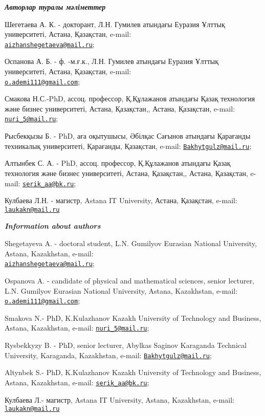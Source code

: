 \begin{authorinfo}
\emph{{\bfseries Авторлар туралы мәліметтер}}

Шегетаева А. К. - докторант, Л.Н. Гумилев атындағы Еуразия Ұлттық
университеті, Астана, Қазақстан, e-mail:\\
\href{mailto:aizhanshegetaeva@mail.ru}{\nolinkurl{aizhanshegetaeva@mail.ru}};

Оспанова А. Б. - ф. -м.ғ.к., Л.Н. Гумилев атындағы Еуразия Ұлттық
университеті, Астана, Қазақстан, e-mail:\\
\href{mailto:o.ademi111@gmail.com}{\nolinkurl{o.ademi111@gmail.com}};

Смакова Н.С.-PhD, ассоц. профессор, Қ.Құлажанов атындағы Қазақ
технология және бизнес университеті, Астана, Қазақстан,, Астана,
Қазақстан, e-mail:
\href{mailto:nuri_5@mail.ru}{\nolinkurl{nuri\_5@mail.ru}};

Рысбекқызы Б. - PhD, аға оқытушысы, Әбілқас Сағынов атындағы Қарағанды
техникалық университеті, Қарағанды, Қазақстан, e-mail:
\href{mailto:Bakhytgulz@mail.ru}{\nolinkurl{Bakhytgulz@mail.ru}};

Алтынбек С. А. - PhD, ассоц. профессор, Қ.Құлажанов атындағы Қазақ
технология және бизнес университеті, Астана, Қазақстан,, Астана,
Қазақстан, e-mail:
\href{mailto:serik_aa@bk.ru}{\nolinkurl{serik\_aa@bk.ru}};

Кулбаева Л.Н. - магистр, Astana IT University, Астана, Қазақстан,
e-mail: \href{mailto:laukakn@mail.ru}{\nolinkurl{laukakn@mail.ru}}

\emph{{\bfseries Information about authors}}

Shegetayeva A. - doctoral student, L.N. Gumilyov Eurasian National
University, Astana, Kazakhstan, e-mail:\\
\href{mailto:aizhanshegetaeva@mail.ru}{\nolinkurl{aizhanshegetaeva@mail.ru}};

Ospanova A. - candidate of physical and mathematical sciences, senior
lecturer, L.N. Gumilyov Eurasian National University, Astana,
Kazakhstan, e-mail:
\href{mailto:o.ademi111@gmail.com}{\nolinkurl{o.ademi111@gmail.com}};

Smakova N.- PhD, K.Kulazhanov Kazakh University of Technology and
Business, Astana, Kazakhstan, e-mail:
\href{mailto:nuri_5@mail.ru}{\nolinkurl{nuri\_5@mail.ru}};

Rysbekkyzy B. - PhD, senior lecturer, Abylkas Saginov Karaganda
Technical University, Karaganda, Kazakhstan, e-mail:
\href{mailto:Bakhytgulz@mail.ru}{\nolinkurl{Bakhytgulz@mail.ru}};

Altynbek S.- PhD, K.Kulazhanov Kazakh University of Technology and
Business, Astana, Kazakhstan, e-mail:
\href{mailto:serik_aa@bk.ru}{\nolinkurl{serik\_aa@bk.ru}};

Кулбаева Л.- магистр, Astana IT University, Astana, Kazakhstan, e-mail:
\href{mailto:laukakn@mail.ru}{\nolinkurl{laukakn@mail.ru}}
\end{authorinfo}
